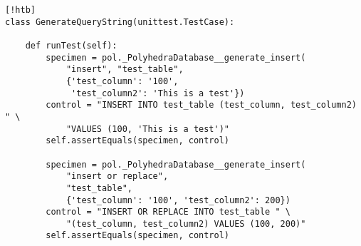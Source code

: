 \begin{lstlisting}[style=custompython,label=code:test-query][!htb]
class GenerateQueryString(unittest.TestCase):

    def runTest(self):
        specimen = pol._PolyhedraDatabase__generate_insert(
            "insert", "test_table",
            {'test_column': '100',
             'test_column2': 'This is a test'})
        control = "INSERT INTO test_table (test_column, test_column2) " \
            "VALUES (100, 'This is a test')"
        self.assertEquals(specimen, control)

        specimen = pol._PolyhedraDatabase__generate_insert(
            "insert or replace",
            "test_table",
            {'test_column': '100', 'test_column2': 200})
        control = "INSERT OR REPLACE INTO test_table " \
            "(test_column, test_column2) VALUES (100, 200)"
        self.assertEquals(specimen, control)
\end{lstlisting}